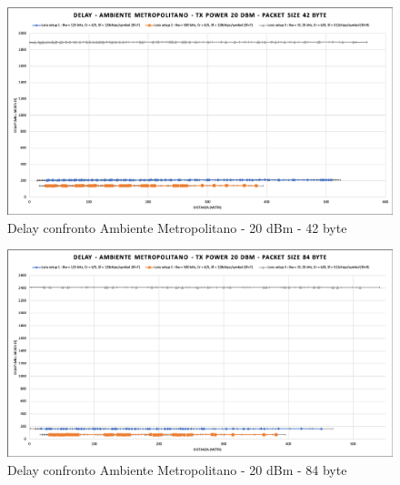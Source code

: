 \documentclass[12pt,a4paper,openright,twoside]{report}
\begin{document}
\begin{figure}[h]                      
\begin{center} 
\includegraphics[width=\textwidth]{DELAY_confronto_AM_20dBm_42byte.png}
\caption[Delay confronto Ambiente Metropolitano - 20 dBm - 42 byte]{Delay confronto Ambiente Metropolitano - 20 dBm - 42 byte}\label{fig:prima}
\end{center}
\end{figure}

\begin{figure}[h]                      
\begin{center} 
\includegraphics[width=\textwidth]{DELAY_confronto_AM_20dBm_84byte.png}
\caption[Delay confronto Ambiente Metropolitano - 20 dBm - 84 byte]{Delay confronto Ambiente Metropolitano - 20 dBm - 84 byte}\label{fig:prima}
\end{center}
\end{figure}
\end{document}
